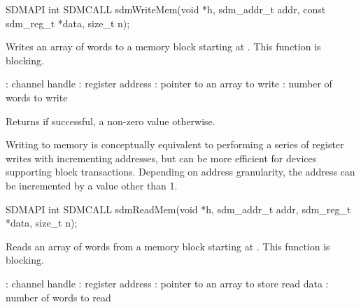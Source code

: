 \documentclass[a4paper,12pt,twoside,extrafontsizes]{memoir}
\begin{document}


\begin{cfuncprototype}
SDMAPI int SDMCALL sdmWriteMem(void *h, sdm_addr_t addr, const sdm_reg_t *data, size_t n);
\end{cfuncprototype}

\begin{funcdescr}
	Writes an array of words to a memory block starting at . This function is blocking.
\end{funcdescr}

\begin{funcparams}
	: channel handle
	: register address
	: pointer to an array to write
	: number of words to write
\end{funcparams}

\begin{funcret}
	Returns  if successful, a non-zero value otherwise.
\end{funcret}

\begin{funcremarks}
	Writing to memory is conceptually equivalent to performing a series of register writes with incrementing addresses, but can be more efficient for devices supporting block transactions. Depending on address granularity, the address can be incremented by a value other than 1.
\end{funcremarks}



\begin{cfuncprototype}
SDMAPI int SDMCALL sdmReadMem(void *h, sdm_addr_t addr, sdm_reg_t *data, size_t n);
\end{cfuncprototype}

\begin{funcdescr}
	Reads an array of words from a memory block starting at . This function is blocking.
\end{funcdescr}

\begin{funcparams}
	: channel handle
	: register address
	: pointer to an array to store read data
	: number of words to read
\end{funcparams}
\end{document}
